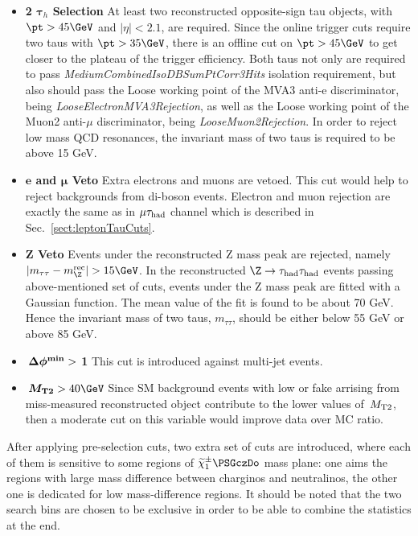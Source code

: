 \begin{itemize}
\item \textbf{2 $\boldsymbol\tau_h$ Selection} At least two reconstructed opposite-sign tau objects, 
with $\pt>45\GeV$ and $|\eta|<2.1$, are required. Since the online trigger cuts require two taus with 
$\pt>35\GeV$, there is an offline cut on $\pt>45\GeV$ to get closer to the plateau of the trigger efficiency. 
Both taus not only are required to pass \emph{MediumCombinedIsoDBSumPtCorr3Hits} isolation requirement, 
but also should pass the Loose working point of the MVA3 anti-e discriminator, being \emph{LooseElectronMVA3Rejection}, 
as well as the Loose working point of the Muon2 anti-$\mu$ discriminator, being \emph{LooseMuon2Rejection}. 
In order to reject low mass QCD resonances, the invariant mass of two taus is required to be above 15 GeV. 
\item \textbf{$\boldsymbol e$ and $\boldsymbol\mu$ Veto} Extra electrons and muons are vetoed. This 
cut would help to reject backgrounds from di-boson events. Electron and muon rejection 
are exactly the same as in $\mu\tau_{\rm had}$ channel which is described in Sec.~\ref{sect:leptonTauCuts}.
\item \textbf{Z Veto} Events under the reconstructed Z mass peak are rejected, namely $|m_{\tau\tau}-m_{\Z}^{\rm rec}|>15\GeV$. 
In the reconstructed $\Z\rightarrow \Tau\Tau$ events passing above-mentioned set of cuts, events under the Z mass peak are fitted 
with a Gaussian function. The mean value of the fit is found to be about 70 GeV. Hence the invariant mass of two taus, $m_{\tau\tau}$, should be 
either below 55 GeV or above 85 GeV.  
\item \textbf{$\boldsymbol{\,{\Delta\phi^{\rm min}}} > $ 1} This cut is introduced against multi-jet events.  
\item \textbf{$\boldsymbol\mttwo>40\GeV$} Since SM background events with low \MET or fake \MET arrising from miss-measured reconstructed object
 contribute to the lower values of $\,{M_{\rm T2}}$, then a moderate cut on this variable would improve data over MC ratio.  
\end{itemize}
After applying pre-selection cuts, two extra set of cuts are introduced, where each of them is sensitive to some regions of $\chione\PSGczDo$ mass plane: one aims the regions with large mass difference between charginos and neutralinos, the other one is dedicated for low mass-difference regions. It should be noted that the two search bins are chosen to be exclusive in order to be able to combine the statistics at the end.
